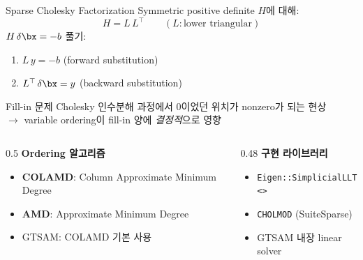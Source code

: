 \begin{frame}{Sparse Cholesky Factorization}
  Symmetric positive definite $H$에 대해:
  \[
    H = L\,L^\top \qquad (L: \text{lower triangular})
  \]
  \pause
  $H\,\delta\bx = -b$ 풀기:
  \begin{enumerate}
    \item $L\,y = -b$ \quad (forward substitution)
    \item $L^\top\,\delta\bx = y$ \quad (backward substitution)
  \end{enumerate}
  \pause
  \begin{block}{Fill-in 문제}
    Cholesky 인수분해 과정에서 0이었던 위치가 nonzero가 되는 현상\\
    $\to$ variable ordering이 fill-in 양에 \emph{결정적}으로 영향
  \end{block}
  \pause
  \begin{columns}[T]
    \begin{column}{0.5\textwidth}
      \textbf{Ordering 알고리즘}
      \begin{itemize}
        \item \textbf{COLAMD}: Column Approximate Minimum Degree
        \item \textbf{AMD}: Approximate Minimum Degree
        \item GTSAM: COLAMD 기본 사용
      \end{itemize}
    \end{column}
    \begin{column}{0.48\textwidth}
      \textbf{구현 라이브러리}
      \begin{itemize}
        \item \texttt{Eigen::SimplicialLLT<>}
        \item \texttt{CHOLMOD} (SuiteSparse)
        \item GTSAM 내장 linear solver
      \end{itemize}
    \end{column}
  \end{columns}
\end{frame}

